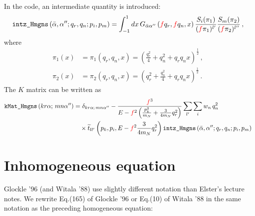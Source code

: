 \documentclass[11pt,aps]{revtex4}
\newcommand{\PF}{{\color{red}f}}
\begin{document}
In the code, an intermediate quantity is introduced:
\begin{equation}
  \texttt{intz\_Hmgns}\left(\bar{\alpha}, \alpha''; q_r, q_n; p_i, p_m\right) = \int_{-1}^1{dx}\, G_{\bar{\alpha}\alpha''}\left(\PF q_r, \PF q_n, x\right) \frac{S_i(\pi_1)}{(\PF \pi_1)^{l'}}
  \frac{S_m(\pi_2)}{(\PF \pi_2)^{l''}} \, ,
\end{equation}
where
\begin{equation}
\begin{split}
  \pi_1(x) &= \pi_1(q_r, q_n, x) = \left(\frac{q_r^2}{4} + q_n^2 + q_r q_n x \right)^{\frac{1}{2}}\, , \\
  \pi_2(x) &= \pi_2(q_r, q_n, x) = \left(q_r^2 + \frac{q_n^2}{4} + q_r q_n x \right)^{\frac{1}{2}} \, . \label{eqn_pi1pi2}
\end{split}
\end{equation}
The $K$ matrix can be written as
\begin{equation}
\begin{split}
  \texttt{kMat\_Hmgns}\left(kr\alpha;\, mn\alpha''\right) &= \delta_{kr\alpha;\, mn\alpha''} - \frac{\PF^3}{E - \PF^2 \left(\frac{p_{k}^2}{m_N} + \frac{3}{4m_N}q_r^2 \right)} \sum_{l'} \sum_{i} w_n\, q_n^2 \\
  & \quad  \times \widetilde{t}_{ll'}\left(p_k, p_i, E - \PF^2 \frac{3}{4m_N}q_r^2\right) \texttt{intz\_Hmgns}\left(\bar{\alpha}, \alpha''; q_r, q_n; p_i, p_m\right)
\end{split}
\end{equation}


\section{Inhomogeneous equation}

Glockle '96 (and Witala '88) use slightly different notation than Elster's lecture notes. We rewrite Eq.(165) of Glockle '96 or Eq.(10) of Witala '88 in the same notation as the preceding homogeneous equation:
\end{document}
